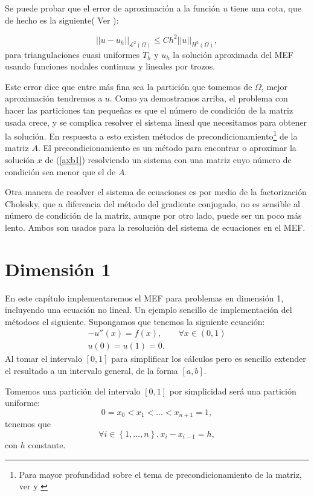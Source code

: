 \documentclass[12pt,spanish,oneside]{book}
\theoremstyle{plain}
\numberwithin{equation}{chapter}
\theoremstyle{definition}
\theoremstyle{remark}
\newcommand{\LD}{\mathcal{L}^2}
\newcommand{\llaves}[1]{\left\lbrace #1\right\rbrace}
\begin{document}
Se puede probar que el error de aproximación a la función $u$ tiene una cota, que de hecho es la siguiente( Ver \cite{Claes}): 

\[||u-u_h||_{\LD(\Omega)}\leq Ch^2||u||_{H^2(\Omega)},\]
para triangulaciones cuasi uniformes $T_h$ y $u_h$ la solución aproximada del MEF usando funciones nodales continuas y lineales por trozos.

Este error dice que entre más fina sea la partición que tomemos de $\Omega$, mejor aproximación tendremos a $u$. Como ya demostramos arriba, el problema con hacer las particiones tan pequeñas es que el número de condición de la matriz usada crece, y se complica resolver el sistema lineal que necesitamos para obtener la solución. En respuesta a esto existen métodos de precondicionamiento\footnote{Para mayor profundidad sobre el tema de precondicionamiento de la matriz, ver \cite{Claes} y \cite{Nocedal}} de la matriz $A$. El precondicionamiento es un método para encontrar o aproximar la solución $x$ de (\ref{axb1}) resolviendo un sistema con una matriz cuyo número de condición sea menor que el de $A$. 

Otra manera de resolver el sistema de ecuaciones es por medio de la factorización Cholesky, que a diferencia del método del gradiente conjugado, no es sensible al número de condición de la matriz, aunque por otro lado, puede ser un poco más lento. Ambos son usados para la resolución del sistema de ecuaciones en el MEF.

\chapter{Dimensión 1}
En este capítulo  implementaremos el MEF para problemas en dimensión 1, incluyendo una ecuación no lineal. Un ejemplo sencillo de implementación del métodoes el siguiente. Supongamos que tenemos la siguiente ecuación:
\begin{align}
-u''(x)=f(x),&\hspace{10pt} \forall x\in(0,1)\\ \label{ecdim1}
u(0)=u(1)=0.&
 \end{align}
Al tomar  el intervalo $[0,1]$ para simplificar los cálculos pero es sencillo extender el resultado a un intervalo general, de la forma $[a,b]$.

Tomemos una partición del intervalo $[0,1]$ por simplicidad será una partición uniforme:
\[0=x_0<x_1<...<x_{n+1}=1,\]
tenemos que 
\[\forall i\in \llaves{1,..., n}, x_i-x_{i-1}=h,\]
con $h$ constante.
\end{document}
